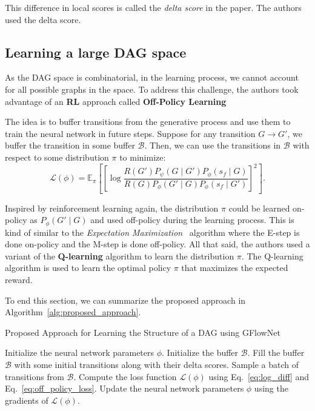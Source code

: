 \documentclass{lxaiproposal}
\begin{document}
    This difference in local scores is called the \textit{delta score} in the paper. The authors used the delta score.

    \subsection{Learning a large DAG space}
    \vspace*{-3mm}

    As the DAG space is combinatorial, in the learning process, we cannot account for all possible graphs in the
    space. To address this challenge, the authors took advantage of an \textbf{RL} approach called \textbf{
        Off-Policy Learning}

    The idea is to buffer transitions from the generative process and use them to train the neural network in future
    steps. Suppose for any transition $G \to G'$, we buffer the transition in some buffer $\mathcal{B}$.
    Then, we can use the transitions in $\mathcal{B}$ with respect to some distribution $\pi$ to minimize:
    \begin{equation}
        \mathcal{L}(\phi) = \mathbb{E}_{\pi} \left[ \left[ \log
        \frac{R(G')P_{\psi}(G \mid G')P_{\phi}(s_f \mid G)}{R(G)P_{\phi}(G' \mid G)P_{\phi}(s_f \mid G')} \right]^2 \right].
        \label{eq:off_policy_loss}

    \end{equation}

    Inspired by reinforcement learning again, the distribution $\pi$ could be learned on-policy as
    $P_{\phi}(G' \mid G)$ and used off-policy during the learning process. This is kind of similar to the \textit{
        Expectation Maximization}~\cite{dempster1977maximumlikelihood} algorithm where the E-step is done on-policy and
    the M-step is done off-policy.
    All that said, the authors used a variant of the \textbf{Q-learning} algorithm to learn the distribution $\pi$.
    The Q-learning algorithm is used to learn the optimal policy $\pi$ that maximizes the expected reward.

    To end this section, we can summarize the proposed approach in Algorithm~\ref{alg:proposed_approach}.
    \begin{algorithm}
        \caption{Proposed Approach for Learning the Structure of a DAG using GFlowNet}
        \label{alg:proposed_approach}
        \begin{algorithmic}[1]
            \State Initialize the neural network parameters $\phi$.
            \State Initialize the buffer $\mathcal{B}$.
            \State Fill the buffer $\mathcal{B}$ with some initial transitions along with their delta scores.
                \State Sample a batch of transitions from $\mathcal{B}$.
                \State Compute the loss function $\mathcal{L}(\phi)$ using Eq.~\eqref{eq:log_diff} and Eq.~\eqref{eq:off_policy_loss}.
                \State Update the neural network parameters $\phi$ using the gradients of $\mathcal{L}(\phi)$.
            \EndWhile
        \end{algorithmic}
    \end{algorithm}
\end{document}
